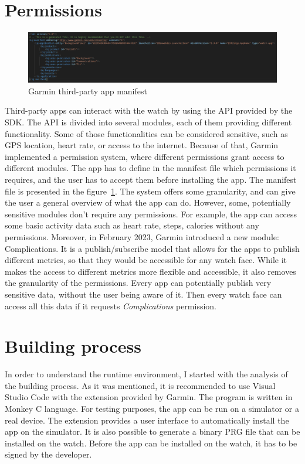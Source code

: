 \section{Permissions}
\begin{figure}[h]
    \centering
    \includegraphics[width=1\linewidth]{../../images/garmin-app-manifest}
    \caption{Garmin third-party app manifest}
    \label{fig:garmin-app-manifest}
\end{figure}
Third-party apps can interact with the watch by using the API provided by the SDK.
The API is divided into several modules, each of them providing different functionality.
Some of those functionalities can be considered sensitive, such as GPS location, heart rate, or access to the internet.
Because of that, Garmin implemented a permission system, where different permissions grant access to different modules.
The app has to define in the manifest file which permissions it requires, and the user has to accept them before installing the app.
The manifest file is presented in the figure~\ref{fig:garmin-app-manifest}.
The system offers some granularity, and can give the user a general overview of what the app can do.
However, some, potentially sensitive modules don't require any permissions.
For example, the app can access some basic activity data such as heart rate, steps, calories without any permissions.
Moreover, in February 2023, Garmin introduced a new module: Complications.
It is a publish/subscribe model that allows for the apps to publish different metrics, so that they would be accessible for any watch face.
While it makes the access to different metrics more flexible and accessible, it also removes the granularity of the permissions.
Every app can potentially publish very sensitive data, without the user being aware of it.
Then every watch face can access all this data if it requests \textit{Complications} permission.

\section{Building process}
In order to understand the runtime environment, I started with the analysis of the building process.
As it was mentioned, it is recommended to use Visual Studio Code with the extension provided by Garmin.
The program is written in Monkey C language.
For testing purposes, the app can be run on a simulator or a real device.
The extension provides a user interface to automatically install the app on the simulator.
It is also possible to generate a binary PRG file that can be installed on the watch.
Before the app can be installed on the watch, it has to be signed by the developer.

